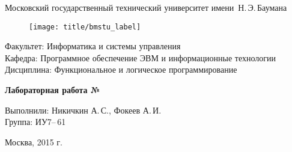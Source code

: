 
\thispagestyle{empty}

\begin{center}
	\Large
	Московский государственный технический университет имени~Н.\,Э.\,Баумана
\end{center}

\begin{figure}[h!]
	\begin{center}
		\texttt{[image: title/bmstu\_label]}
	\end{center}
\end{figure}

{\large
\noindent
Факультет: Информатика и системы управления\\[2mm]
\noindent
Кафедра: Программное обеспечение ЭВМ и информационные технологии\\[2mm]
\noindent
Дисциплина: Функциональное и логическое программирование
\vspace{1.5cm}}

\begin{center}
	\Large
	\textbf{Лабораторная работа №}
\end{center}
\vfill

\hfill\begin{minipage}{0.6\textwidth}
	Выполнили: Никичкин А.\,С., Фокеев А.\,И.\\
	Группа: ИУ7--\,61
\end{minipage}
\vfill

\begin{center}
	Москва, 2015 г.
\end{center}
